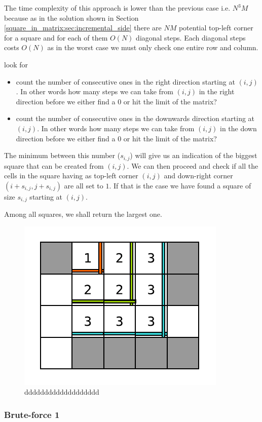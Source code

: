 The time complexity of this approach is lower than the previous case i.e. $N^3M$
because as in the solution shown in Section
\ref{square_in_matrix:sec:incremental_side} there are $NM$ potential top-left
corner for a square and for each of them $O(N)$ diagonal steps. Each diagonal
steps costs $O(N)$ as in the worst case we must only check one entire row and
column. 






look for 
\begin{itemize}
	 \item count the number of consecutive ones in the right direction starting at $(i,j)$. In other
	 words how many steps we can take from $(i,j)$ in the right direction  before we either find a
	 $0$ or hit the limit of the matrix? 
	 \item count the number of consecutive ones in the downwards direction starting at $(i,j)$. In
	 other words how many steps we can take from $(i,j)$ in the down direction before we either find
	 a $0$ or hit the limit of the matrix? 
\end{itemize}
The minimum between this number ($s_{i,j}$) will give us an indication of the biggest square that
can be created from $(i,j)$. We can then proceed and check if all the cells in the square having as
top-left corner $(i,j)$ and down-right corner $(i+s_{i,j},j+s_{i,j})$ are all set to $1$. If that is
the case we have found a square of size $s_{i,j}$ starting at $(i,j)$. 

Among all squares, we shall return the largest one. 

\begin{figure}
	\centering
	\label{fig:square_in_matrix:square_matrix_diagonal}
	\includegraphics[]{sources/square_in_matrix/images/square_matrix_diagonal}
	\caption{ddddddddddddddddddd }
\end{figure}


\subsubsection{Brute-force 1}


